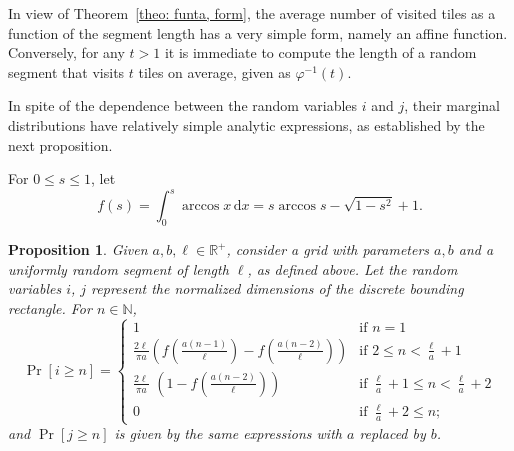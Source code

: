 \documentclass[12pt, a4paper]{article}
\newcommand{\diff}{\mathrm d}
\newcommand{\funta}{\varphi} %
\newcommand{\len}{\ell} %
\newcommand{\tiles}{t} %
\newcommand{\genvar}{s}
\newtheorem{proposition}{Proposition}%
\begin{document}
In view of Theorem~\ref{theo: funta, form}, the average number of visited tiles as a function of the segment length has a very simple form, namely an affine function. Conversely, for any $\tiles>1$ it is immediate to compute the length of a random segment that visits $\tiles$ tiles on average, given as $\funta^{-1}(\tiles)$.

In spite of the dependence between the random variables $i$ and $j$, their marginal distributions have relatively simple analytic expressions, as established by the next proposition.

For $0 \leq \genvar \leq 1$, let
\begin{equation}
\label{eq: f}
f(\genvar) = \int_0^\genvar \arccos x \, \diff x = \genvar \arccos \genvar - \sqrt{1-\genvar^2} + 1.
\end{equation}

\begin{proposition}
\label{prop: Pr i}
Given $a, b, \len \in \mathbb R^+$, consider a grid with parameters $a, b$ and a uniformly random segment of length $\len$, as defined above. Let the random variables $i$, $j$ represent the normalized dimensions of the discrete bounding rectangle. For $n \in \mathbb N$,
\begin{equation}
\label{eq: Pr i geq n}
\Pr[i \geq n] = \begin{cases}
\displaystyle
1 &\text{if\ \ } \displaystyle n =1 \\[1 mm] %
\displaystyle
\frac{2\len}{\pi a} \left(f\left(\frac{a(n-1)}{\len}\right)-f\left(\frac{a(n-2)}{\len} \right)\right) &\text{if\ \ } \displaystyle 2 \leq n < \frac \len a + 1 \\[4 mm] %
\displaystyle
\frac{2\len}{\pi a}\,\, \left(1 - f\left(\frac{a(n-2)}{\len}\right)\right) &\text{if\ \ } \displaystyle \frac\len a + 1 \leq n < \frac\len a+2 \\[3 mm] %
\displaystyle
0 &\text{if\ \ } \displaystyle \frac \len a + 2 \leq  n;
\end{cases}
\end{equation}
and $\Pr[j \geq n]$ is given by the same expressions with $a$ replaced by $b$.
\end{proposition}
\end{document}
